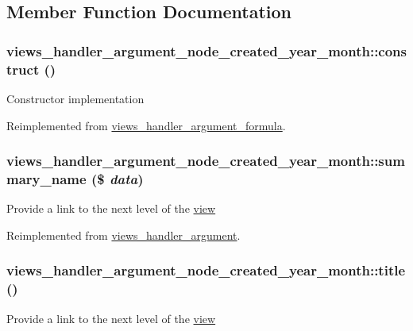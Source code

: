 \subsection{Member Function Documentation}
\hypertarget{classviews__handler__argument__node__created__year__month_a9e090c0caf0a169fe3f9a78160896d01}{
\subsubsection[{construct}]{\setlength{\rightskip}{0pt plus 5cm}views\_\-handler\_\-argument\_\-node\_\-created\_\-year\_\-month::construct ()}}
\label{classviews__handler__argument__node__created__year__month_a9e090c0caf0a169fe3f9a78160896d01}
Constructor implementation 

Reimplemented from \hyperlink{classviews__handler__argument__formula_a01284402427de2bcfa1b1da5792a2332}{views\_\-handler\_\-argument\_\-formula}.\hypertarget{classviews__handler__argument__node__created__year__month_a05689c48f520a9f0a1dc0008050eae03}{
\subsubsection[{summary\_\-name}]{\setlength{\rightskip}{0pt plus 5cm}views\_\-handler\_\-argument\_\-node\_\-created\_\-year\_\-month::summary\_\-name (\$ {\em data})}}
\label{classviews__handler__argument__node__created__year__month_a05689c48f520a9f0a1dc0008050eae03}
Provide a link to the next level of the \hyperlink{classview}{view} 

Reimplemented from \hyperlink{classviews__handler__argument_a4c55a340453eed4d35c69f7ac790cac1}{views\_\-handler\_\-argument}.\hypertarget{classviews__handler__argument__node__created__year__month_a80dd9527f548e32a8e8f9279fe0ec3d3}{
\subsubsection[{title}]{\setlength{\rightskip}{0pt plus 5cm}views\_\-handler\_\-argument\_\-node\_\-created\_\-year\_\-month::title ()}}
\label{classviews__handler__argument__node__created__year__month_a80dd9527f548e32a8e8f9279fe0ec3d3}
Provide a link to the next level of the \hyperlink{classview}{view} 

